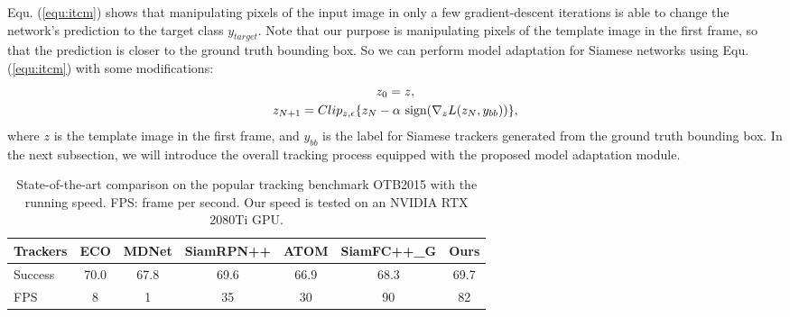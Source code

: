 \documentclass[journal]{IEEEtran}
\begin{document}
Equ. (\ref{equ:itcm}) shows that manipulating pixels of the input image in only a few gradient-descent iterations is able to change the network's prediction to the target class $y_{target}$. Note that our purpose is manipulating pixels of the template image in the first frame, so that the prediction is closer to the ground truth bounding box. So we can perform model adaptation for Siamese networks using Equ. (\ref{equ:itcm}) with some modifications:
\vspace{-0.1cm}
\begin{equation}
    \begin{gathered}
        z_0 = z,\\
        z_{N+1} = Clip_{z,\epsilon}\{z_N -\alpha \text{ sign}(\nabla_z L(z_N,y_{bb}))\},
    \end{gathered}
    \vspace{-0.1cm}
    \label{equ:adaptaion}
\end{equation}
where $z$ is the template image in the first frame, and $y_{bb}$ is the label for Siamese trackers generated from the ground truth bounding box. In the next subsection, we will introduce the overall tracking process equipped with the proposed model adaptation module.

\begin{table}[t]
\renewcommand\arraystretch{0.8}
\caption{State-of-the-art comparison on the popular tracking benchmark OTB2015 with the running speed. FPS: frame per second. Our speed is tested on an NVIDIA RTX 2080Ti GPU.}
\vspace{-0.3cm}
\setlength{\tabcolsep}{3pt}
\begin{center}
\begin{tabular}{l | c c c c c c}
\toprule
Trackers & ECO & MDNet & SiamRPN++ & ATOM & SiamFC++\_G & Ours \\
\midrule
Success & 70.0 & 67.8  & 69.6      & 66.9      & 68.3       & 69.7 \\
FPS     & 8    & 1     & 35        & 30       & 90         & 82  \\
\bottomrule
\end{tabular}
\end{center}
\label{table:otb}
\vspace{-0.2cm}
\end{table}
\end{document}
